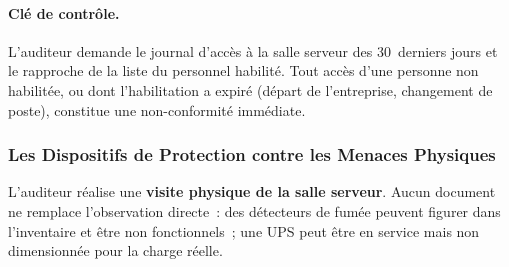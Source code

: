 \paragraph{Clé de contrôle.}
L'auditeur demande le journal d'accès à la salle serveur des 30~derniers jours et
le rapproche de la liste du personnel habilité. Tout accès d'une personne non
habilitée, ou dont l'habilitation a expiré (départ de l'entreprise, changement de
poste), constitue une non-conformité immédiate.

\subsubsection{Les Dispositifs de Protection contre les Menaces Physiques}

L'auditeur réalise une \textbf{visite physique de la salle serveur}. Aucun document
ne remplace l'observation directe~: des détecteurs de fumée peuvent figurer dans
l'inventaire et être non fonctionnels~; une UPS peut être en service mais non
dimensionnée pour la charge réelle.

